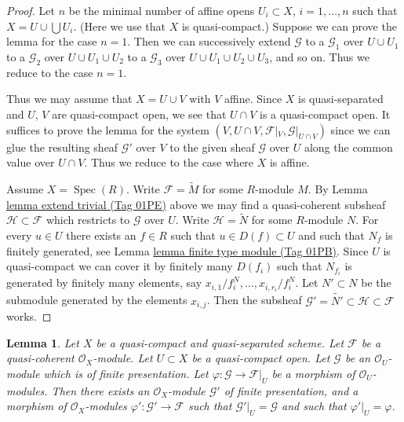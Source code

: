 \documentclass{amsart}
\theoremstyle{plain}
\newtheorem{lemma}[subsection]{Lemma}
\theoremstyle{definition}
\theoremstyle{remark}
\numberwithin{equation}{subsection}
\def\Spec{\mathop{\mathrm{Spec}}}
\begin{document}
\begin{proof}
Let $n$ be the minimal number of affine opens $U_i \subset X$,
$i = 1, \ldots , n$ such that $X = U \cup \bigcup U_i$.
(Here we use that $X$ is quasi-compact.) Suppose
we can prove the lemma for the case $n = 1$. Then we can successively
extend $\mathcal{G}$
to a $\mathcal{G}_1$ over $U \cup U_1$
to a $\mathcal{G}_2$ over $U \cup U_1 \cup U_2$
to a $\mathcal{G}_3$ over $U \cup U_1 \cup U_2 \cup U_3$,
and so on.
Thus we reduce to the case $n = 1$.

\medskip\noindent
Thus we may assume that $X = U \cup V$ with $V$ affine.
Since $X$ is quasi-separated and $U$, $V$ are quasi-compact open,
we see that $U \cap V$ is a quasi-compact open. It suffices to prove the
lemma for the system $(V, U \cap V, \mathcal{F}|_V, \mathcal{G}|_{U \cap V})$
since we can glue the resulting sheaf $\mathcal{G}'$ over $V$
to the given sheaf $\mathcal{G}$ over $U$ along the common value
over $U \cap V$.
Thus we reduce to the case where $X$ is affine.

\medskip\noindent
Assume $X = \Spec(R)$. Write $\mathcal{F} = \widetilde M$
for some $R$-module $M$. By Lemma \href{https://stacks.math.columbia.edu/tag/01PE}{lemma extend trivial (Tag 01PE)} above we may
find a quasi-coherent subsheaf $\mathcal{H} \subset \mathcal{F}$
which restricts to $\mathcal{G}$ over $U$.
Write $\mathcal{H} = \widetilde N$ for some $R$-module $N$.
For every $u \in U$ there exists an $f \in R$ such that
$u \in D(f) \subset U$ and such that $N_f$ is finitely generated,
see Lemma \href{https://stacks.math.columbia.edu/tag/01PB}{lemma finite type module (Tag 01PB)}.
Since $U$ is quasi-compact we can cover it by finitely
many $D(f_i)$ such that $N_{f_i}$ is generated by
finitely many elements, say $x_{i, 1}/f_i^N, \ldots, x_{i, r_i}/f_i^N$.
Let $N' \subset N$ be the submodule generated by the elements
$x_{i, j}$. Then the subsheaf
$\mathcal{G}' = \widetilde{N'} \subset \mathcal{H} \subset \mathcal{F}$
works.
\end{proof}


\begin{lemma}
\label{lemma-extend-finite-presentation}
Let $X$ be a quasi-compact and quasi-separated scheme.
Let $\mathcal{F}$ be a quasi-coherent $\mathcal{O}_X$-module.
Let $U \subset X$ be a quasi-compact open.
Let $\mathcal{G}$ be an $\mathcal{O}_U$-module which is of finite presentation.
Let $\varphi : \mathcal{G} \to \mathcal{F}|_U$ be a morphism of
$\mathcal{O}_U$-modules.
Then there exists an $\mathcal{O}_X$-module
$\mathcal{G}'$ of finite presentation, and a morphism
of $\mathcal{O}_X$-modules $\varphi' : \mathcal{G}' \to \mathcal{F}$
such that $\mathcal{G}'|_U = \mathcal{G}$ and such that
$\varphi'|_U = \varphi$.
\end{lemma}
\end{document}
